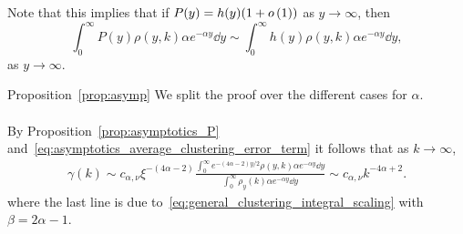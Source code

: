 Note that this implies that if $P(y) = h(y)(1 + o\left(1\right))$ as $y \to \infty$, then 
\begin{equation}\label{eq:asymptotics_average_clustering_error_term}
	\int_0^\infty P(y) \rho(y,k) \alpha e^{-\alpha y} \dd y
	\sim \int_0^\infty h(y) \rho(y,k) \alpha e^{-\alpha y} \dd y,
\end{equation}
as $y \to \infty$.

\begin{proofof}{Proposition~\ref{prop:asymp}}
We split the proof over the different cases for $\alpha$.

\paragraph{}
By Proposition~\ref{prop:asymptotics_P} and~\eqref{eq:asymptotics_average_clustering_error_term}  it follows that as $k \to \infty$,
\begin{align*}
	\gamma(k) \sim c_{\alpha,\nu} \xi^{-(4\alpha - 2)} \frac{\int_0^{\infty} e^{-(4\alpha - 2)y/2} \rho(y,k) \alpha  e^{-\alpha y} \dd y}
		{\int_0^\infty \rho_{y}(k) \alpha e^{-\alpha y} \dd y} 
	\sim c_{\alpha,\nu} k^{-4\alpha + 2}.
\end{align*}
where the last line is due to~\eqref{eq:general_clustering_integral_scaling} with $\beta = 2\alpha - 1$.


\end{proofof}
